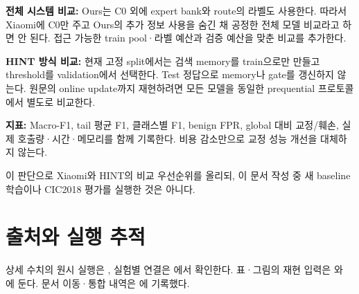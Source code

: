 \par\noindent \textbullet\enspace \textbf{전체 시스템 비교:} Ours는 C0 외에 expert bank와 route의 라벨도 사용한다. 따라서 Xiaomi에 C0만 주고 Ours의 추가 정보 사용을 숨긴 채 공정한 전체 모델 비교라고 하면 안 된다. 접근 가능한 train pool·라벨 예산과 검증 예산을 맞춘 비교를 추가한다.


\par\noindent \textbullet\enspace \textbf{HINT 방식 비교:} 현재 고정 split에서는 검색 memory를 train으로만 만들고 threshold를 validation에서 선택한다. Test 정답으로 memory나 gate를 갱신하지 않는다. 원문의 online update까지 재현하려면 모든 모델을 동일한 prequential 프로토콜에서 별도로 비교한다.


\par\noindent \textbullet\enspace \textbf{지표:} Macro-F1, tail 평균 F1, 클래스별 F1, benign FPR, global 대비 교정/\allowbreak{}훼손, 실제 호출량·시간·메모리를 함께 기록한다. 비용 감소만으로 교정 성능 개선을 대체하지 않는다.


이 판단으로 Xiaomi와 HINT의 비교 우선순위를 올리되, 이 문서 작성 중 새 baseline 학습이나 CIC2018 평가를 실행한 것은 아니다.



\section*{출처와 실행 추적}

상세 수치의 원시 실행은 , 실험별 연결은 에서 확인한다. 표·그림의 재현 입력은 와 에 둔다. 문서 이동·통합 내역은 에 기록했다.


